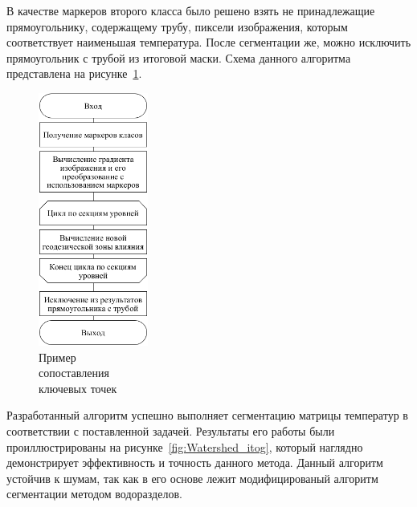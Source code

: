 \documentclass[14pt, a4paper]{extreport}
\begin{document}
	В качестве маркеров второго класса было решено взять не принадлежащие прямоугольнику, содержащему трубу, пиксели изображения, которым соответствует наименьшая температура. После сегментации же, можно исключить прямоугольник с трубой из итоговой маски. Схема данного алгоритма представлена на рисунке~\ref{fig:waterShedSegmentation}.
	
	\begin{figure}[h!]
		\centering
		\includegraphics[width = 0.32\textwidth]{image/chapter_3/waterShedSegmentation}	
		\caption{Пример\\ сопоставления\\ ключевых точек}
		\label{fig:waterShedSegmentation}
	\end{figure}
	
	Разработанный алгоритм успешно выполняет сегментацию матрицы температур в соответствии с поставленной задачей. Результаты его работы были проиллюстрированы на рисунке~\ref{fig:Watershed_itog}, который наглядно демонстрирует эффективность и точность данного метода. Данный алгоритм устойчив к шумам, так как в его основе лежит модифицированый алгоритм сегментации методом водоразделов.
	
\end{document}
